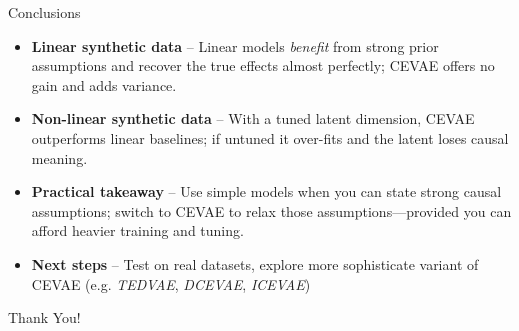 \documentclass[10pt]{beamer}
\begin{document}
\begin{frame}{Conclusions}

\begin{itemize}\setlength\itemsep{6pt}

  \item \textbf{Linear synthetic data} -- 
        Linear models \emph{benefit} from strong prior assumptions and recover the true effects almost perfectly; CEVAE offers no gain and adds variance.

  \item \textbf{Non-linear synthetic data} -- 
        With a tuned latent dimension, CEVAE outperforms linear baselines; if untuned it over-fits and the latent loses causal meaning.

  \item \textbf{Practical takeaway}  
         -- Use simple models when you can state strong causal assumptions; switch to CEVAE to relax those assumptions—provided you can afford heavier training and tuning.

  \item \textbf{Next steps} -- 
        Test on real datasets, explore more sophisticate variant of CEVAE (e.g. \emph{TEDVAE}, \emph{DCEVAE}, \emph{ICEVAE})

\end{itemize}

\end{frame}

{
\begin{frame}[standout]
\thispagestyle{empty}
  {\LARGE Thank You!}
\end{frame}
}
\end{document}
